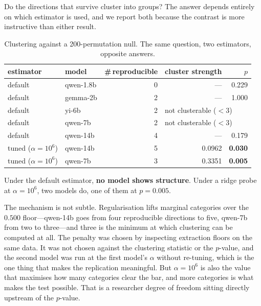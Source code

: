 \documentclass{article}
\begin{document}
Do the directions that survive cluster into groups? The answer depends entirely
on which estimator is used, and we report both because the contrast is more
instructive than either result.

\begin{table}[h]
\centering
\caption{Clustering against a 200-permutation null. The same question, two
estimators, opposite answers.}
\label{tab:fork}
\begin{tabular}{llrrr}
\toprule
estimator & model & \#\,reproducible & cluster strength & $p$ \\
\midrule
default & qwen-1.8b & 0 & --- & 0.229 \\
default & gemma-2b  & 2 & --- & 1.000 \\
default & yi-6b     & 2 & \multicolumn{2}{l}{not clusterable ($<3$)} \\
default & qwen-7b   & 2 & \multicolumn{2}{l}{not clusterable ($<3$)} \\
default & qwen-14b  & 4 & --- & 0.179 \\
\midrule
tuned ($\alpha{=}10^{6}$) & qwen-14b & 5 & 0.0962 & \textbf{0.030} \\
tuned ($\alpha{=}10^{6}$) & qwen-7b  & 3 & 0.3351 & \textbf{0.005} \\
\bottomrule
\end{tabular}
\end{table}


Under the default estimator, \textbf{no model shows structure}. Under a ridge
probe at $\alpha{=}10^{6}$, two models do, one of them at $p=0.005$.

The mechanism is not subtle. Regularisation lifts marginal categories over the
$0.500$ floor---qwen-14b goes from four reproducible directions to five, qwen-7b
from two to three---and three is the minimum at which clustering can be computed
at all. The penalty was chosen by inspecting extraction floors on the same data.
It was not chosen against the clustering statistic or the $p$-value, and the
second model was run at the first model's $\alpha$ without re-tuning, which is
the one thing that makes the replication meaningful. But $\alpha{=}10^{6}$ is
also the value that maximises how many categories clear the bar, and more
categories is what makes the test possible. That is a researcher degree of
freedom sitting directly upstream of the $p$-value.
\end{document}

